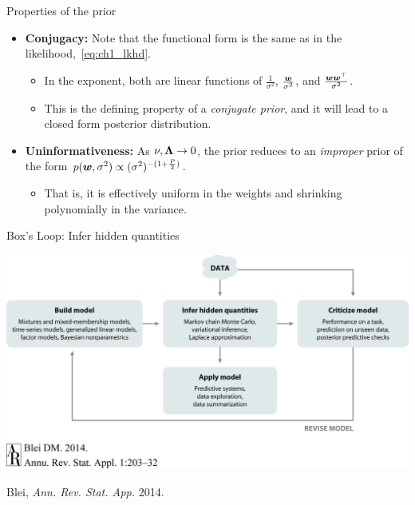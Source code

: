 \documentclass[aspectratio=169]{beamer}
\begin{document}
\begin{frame}{Properties of the prior}
\begin{itemize}
    \item \textbf{Conjugacy:} Note that the functional form is the same as in the likelihood,~\eqref{eq:ch1_lkhd}.
    
    \begin{itemize}
        \item In the exponent, both are linear functions of $\frac{1}{\sigma^2}$, $\frac{\boldsymbol{w}}{\sigma^2}$, and $\frac{\boldsymbol{w} \boldsymbol{w}^\top}{\sigma^2}$. 
        \item This is the  defining property of a \emph{conjugate prior}, and it will lead to a closed form posterior distribution.
    \end{itemize}
    
    \item \textbf{Uninformativeness:} As $\nu, \boldsymbol{\Lambda} \to 0$, the prior reduces to an \emph{improper} prior of the form $p(\boldsymbol{w}, \sigma^2) \propto (\sigma^2)^{-(1+\frac{P}{2})}$. 
    
    \begin{itemize}
        \item That is, it is effectively uniform in the weights and shrinking polynomially in the variance.
    \end{itemize}
    
\end{itemize}

\end{frame}




\begin{frame}{Box's Loop: Infer hidden quantities}
\begin{center}
\includegraphics[width=.85\linewidth]{figures/lap1/boxsloop.jpeg}\\
\end{center} 
\begin{flushright}
{\footnotesize Blei, \textit{Ann. Rev. Stat. App.} 2014.}
\end{flushright}
\end{frame}
\end{document}

